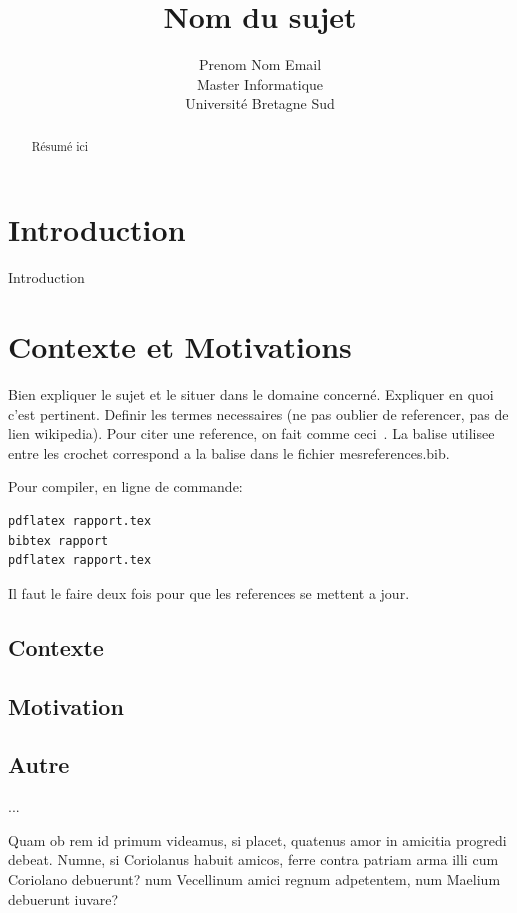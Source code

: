 \documentclass{inf2164}
\title[Titre court]{Nom du sujet}
\author[Nom]%
       {Prenom Nom Email\\
       Master Informatique\\
       Universit\'e Bretagne Sud}
\begin{document}
\maketitle

\begin{abstract}
R\'esum\'e ici 

\end{abstract}
\section{Introduction}

Introduction

\section{Contexte et Motivations}
Bien expliquer le sujet et le situer dans le domaine concerné. Expliquer en quoi c'est pertinent. Definir les termes necessaires (ne pas oublier de referencer, pas de lien wikipedia).
Pour citer une reference, on fait comme ceci~\cite{sen2009}. La balise utilisee entre les crochet correspond a la balise dans le fichier mesreferences.bib.

Pour compiler, en ligne de commande: 
\begin{verbatim}
pdflatex rapport.tex 
bibtex rapport 
pdflatex rapport.tex
\end{verbatim}
Il faut le faire deux fois pour que les references se mettent a jour.

\subsection{Contexte}
\subsection{Motivation}
\subsection{Autre}
...


Quam ob rem id primum videamus, si placet, quatenus amor in amicitia progredi debeat. Numne, si Coriolanus habuit amicos, ferre contra patriam arma illi cum Coriolano debuerunt? num Vecellinum amici regnum adpetentem, num Maelium debuerunt iuvare?
\end{document}
